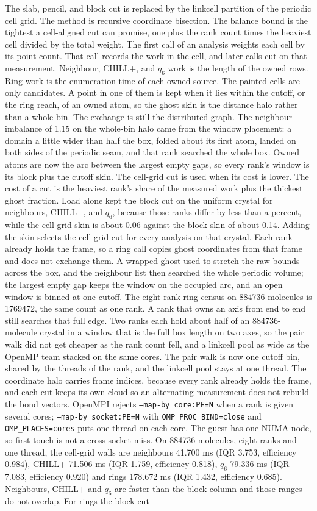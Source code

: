 \documentclass[preprint,12pt]{elsarticle}
\begin{document}
The slab, pencil, and block cut is replaced by the linkcell partition of the periodic cell grid. The method is recursive coordinate bisection. The balance bound is the tightest a cell-aligned cut can promise, one plus the rank count times the heaviest cell divided by the total weight. The first call of an analysis weights each cell by its point count. That call records the work in the cell, and later calls cut on that measurement. Neighbour, CHILL+, and $q_6$ work is the length of the owned rows. Ring work is the enumeration time of each owned source. The painted cells are only candidates. A point in one of them is kept when it lies within the cutoff, or the ring reach, of an owned atom, so the ghost skin is the distance halo rather than a whole bin. The exchange is still the distributed graph. The neighbour imbalance of 1.15 on the whole-bin halo came from the window placement: a domain a little wider than half the box, folded about its first atom, landed on both sides of the periodic seam, and that rank searched the whole box. Owned atoms are now the arc between the largest empty gaps, so every rank's window is its block plus the cutoff skin. The cell-grid cut is used when its cost is lower. The cost of a cut is the heaviest rank's share of the measured work plus the thickest ghost fraction. Load alone kept the block cut on the uniform crystal for neighbours, CHILL+, and $q_6$, because those ranks differ by less than a percent, while the cell-grid skin is about 0.06 against the block skin of about 0.14. Adding the skin selects the cell-grid cut for every analysis on that crystal. Each rank already holds the frame, so a ring call copies ghost coordinates from that frame and does not exchange them. A wrapped ghost used to stretch the raw bounds across the box, and the neighbour list then searched the whole periodic volume; the largest empty gap keeps the window on the occupied arc, and an open window is binned at one cutoff. The eight-rank ring census on 884736 molecules is 1769472, the same count as one rank. A rank that owns an axis from end to end still searches that full edge. Two ranks each hold about half of an 884736-molecule crystal in a window that is the full box length on two axes, so the pair walk did not get cheaper as the rank count fell, and a linkcell pool as wide as the OpenMP team stacked on the same cores. The pair walk is now one cutoff bin, shared by the threads of the rank, and the linkcell pool stays at one thread. The coordinate halo carries frame indices, because every rank already holds the frame, and each cut keeps its own cloud so an alternating measurement does not rebuild the bond vectors. OpenMPI rejects \texttt{--map-by core:PE=N} when a rank is given several cores; \texttt{--map-by socket:PE=N} with \texttt{OMP\_PROC\_BIND=close} and \texttt{OMP\_PLACES=cores} puts one thread on each core. The guest has one NUMA node, so first touch is not a cross-socket miss. On 884736 molecules, eight ranks and one thread, the cell-grid walls are neighbours 41.700 ms (IQR 3.753, efficiency 0.984), CHILL+ 71.506 ms (IQR 1.759, efficiency 0.818), $q_6$ 79.336 ms (IQR 7.083, efficiency 0.920) and rings 178.672 ms (IQR 1.432, efficiency 0.685). Neighbours, CHILL+ and $q_6$ are faster than the block column and those ranges do not overlap. For rings the block cut 
\end{document}
